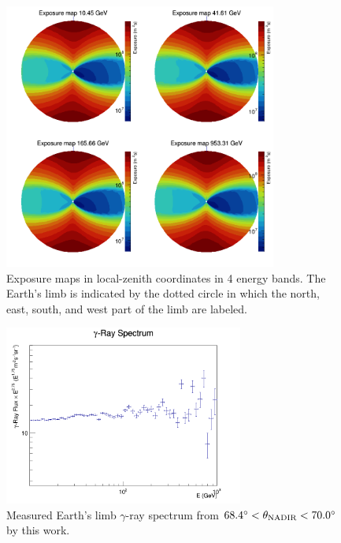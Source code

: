\begin{figure}[h!]
    \centering
    \includegraphics[width=0.8\textwidth]{content/result_and_discussion/figures/zoom_rs/polar_expmaps.png}
    \caption{
        Exposure maps in local-zenith coordinates in 4 energy bands.
        The Earth's limb is indicated by the dotted circle in which
        the north, east, south, and west part of the limb are labeled. 
    }
    \label{fig:expmap_polar}
\end{figure}

\begin{figure}[h!]
    \centering
    \includegraphics[width=0.7\textwidth]{content/result_and_discussion/figures/flx_hist.png}
    \caption{
        Measured Earth's limb $\gamma$-ray spectrum
        from $68.4^\circ<\theta_{\rm NADIR}<70.0^\circ$ by this work.
    }
    \label{fig:flxhist}
\end{figure}


